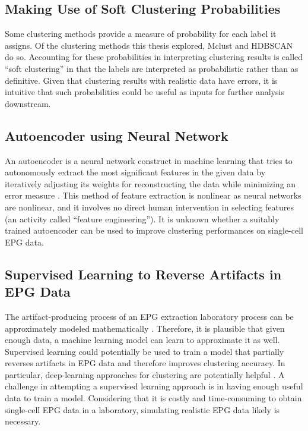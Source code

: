 \subsection{Making Use of Soft Clustering Probabilities}

Some clustering methods provide a measure of probability for each label it assigns. Of the clustering methods this thesis explored, Mclust and HDBSCAN do so. Accounting for these probabilities in interpreting clustering results is called ``soft clustering'' in that the labels are interpreted as probabilistic rather than as definitive. Given that clustering results with realistic data have errors, it is intuitive that such probabilities could be useful as inputs for further analysis downstream.

\subsection{Autoencoder using Neural Network}

An autoencoder is a neural network construct in machine learning that tries to autonomously extract the most significant features in the given data by iteratively adjusting its weights for reconstructing the data while minimizing an error measure \cite{cai_unsupervised_2021}. This method of feature extraction is nonlinear as neural networks are nonlinear, and it involves no direct human intervention in selecting features (an activity called ``feature engineering''). It is unknown whether a suitably trained autoencoder can be used to improve clustering performances on single-cell EPG data.

\subsection{Supervised Learning to Reverse Artifacts in EPG Data}

The artifact-producing process of an EPG extraction laboratory process can be approximately modeled mathematically \cite{duffy_exploring_2017}. Therefore, it is plausible that given enough data, a machine learning model can learn to approximate it as well. Supervised learning could potentially be used to train a model that partially reverses artifacts in EPG data and therefore improves clustering accuracy. In particular, deep-learning approaches for clustering are potentially helpful \cite{karim_deep_2021}. A challenge in attempting a supervised learning approach is in having enough useful data to train a model. Considering that it is costly and time-consuming to obtain single-cell EPG data in a laboratory, simulating realistic EPG data likely is necessary.

